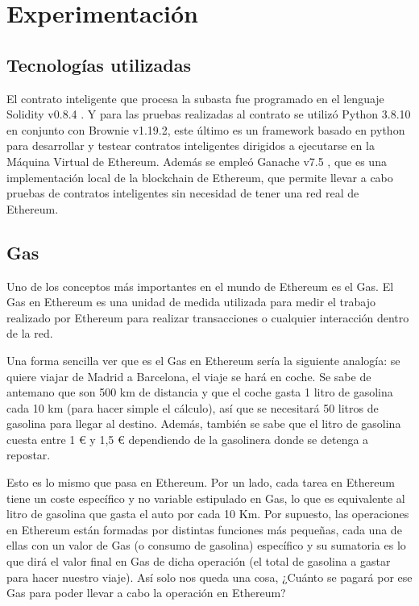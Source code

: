     \section{Experimentación}
    \subsection{Tecnologías utilizadas}
      El contrato inteligente que procesa la subasta fue programado en el lenguaje Solidity v0.8.4 
      \parencite{solidity0.8.4}. Y para las pruebas realizadas al contrato se utilizó Python 3.8.10 
      \parencite{python3.8} en conjunto con Brownie v1.19.2, este último es un framework basado en python
      para desarrollar y testear contratos inteligentes dirigidos a ejecutarse en la Máquina Virtual de 
      Ethereum. Además se empleó Ganache v7.5 \parencite{ganache7.5}, que es una implementación local de la blockchain de
      Ethereum, que permite llevar a cabo pruebas de contratos inteligentes sin necesidad de tener una red
      real de Ethereum.

      \subsection{Gas}
        Uno de los conceptos más importantes en el mundo de Ethereum es el Gas. El Gas en Ethereum es una 
        unidad de medida utilizada para medir el trabajo realizado por Ethereum para realizar transacciones o 
        cualquier interacción dentro de la red.


        Una forma sencilla ver que es el Gas en Ethereum sería la siguiente analogía: se quiere viajar 
        de Madrid a Barcelona, el viaje se hará en coche. Se sabe de antemano que son 
        500 km de distancia y que el coche gasta 1 litro de gasolina cada 10 km (para hacer simple el cálculo), 
        así que se necesitará 50 litros de gasolina para llegar al destino. Además, también se sabe que el 
        litro de gasolina cuesta entre 1 € y 1,5 € dependiendo de la gasolinera donde se detenga a repostar.


        Esto es lo mismo que pasa en Ethereum. Por un lado, cada tarea en Ethereum tiene un coste específico 
        y no variable estipulado en Gas, lo que es equivalente al litro de gasolina que gasta el auto por cada 
        10 Km. Por supuesto, las operaciones en Ethereum están formadas por distintas funciones más pequeñas, 
        cada una de ellas con un valor de Gas (o consumo de gasolina) específico y su sumatoria es lo que 
        dirá el valor final en Gas de dicha operación (el total de gasolina a gastar para hacer nuestro viaje).
        Así solo nos queda una cosa, ¿Cuánto se pagará por ese Gas para poder llevar a cabo la operación en 
        Ethereum?


